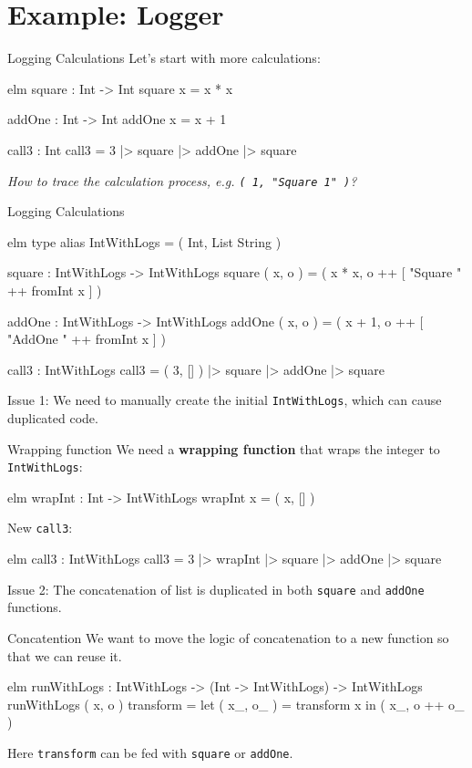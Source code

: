 \documentclass{beamer}
\begin{document}
\section{Example: Logger}

\begin{frame}[fragile]{Logging Calculations}
	Let's start with more calculations:
	\begin{codetbox}{elm}
square : Int -> Int
square x =
    x * x

addOne : Int -> Int
addOne x =
    x + 1

call3 : Int
call3 =
    3 |> square |> addOne |> square
	\end{codetbox}
	\pause
	\em How to trace the calculation process, e.g. {\tt ( 1, "Square 1" )}? \em
\end{frame}

\begin{frame}[fragile]{Logging Calculations}
	\begin{codetbox}{elm}
type alias IntWithLogs =
    ( Int, List String )

square : IntWithLogs -> IntWithLogs
square ( x, o ) =
    ( x * x, o ++ [ "Square " ++ fromInt x ] )

addOne : IntWithLogs -> IntWithLogs
addOne ( x, o ) =
    ( x + 1, o ++ [ "AddOne " ++ fromInt x ] )

call3 : IntWithLogs
call3 =
    ( 3, [] ) |> square |> addOne |> square
	\end{codetbox}
	\pause
	Issue 1: We need to manually create the initial {\tt IntWithLogs}, which can cause
	duplicated code.

\end{frame}

\begin{frame}[fragile]{Wrapping function}
	We need a \textbf{wrapping function} that wraps the integer to {\tt IntWithLogs}:
	\begin{codetbox}{elm}
wrapInt : Int -> IntWithLogs
wrapInt x =
  ( x, [] )
	\end{codetbox}
	New {\tt call3}:
	\begin{codetbox}{elm}
call3 : IntWithLogs
call3 =
  3 |> wrapInt |> square |> addOne |> square
	\end{codetbox}
	\pause
	Issue 2: The concatenation of list is duplicated in both {\tt square} and {\tt addOne} functions.
\end{frame}

\begin{frame}[fragile]{Concatention}
	We want to move the logic of concatenation to a new function so that we can reuse it.
	\begin{codetbox}{elm}
runWithLogs : IntWithLogs -> (Int -> IntWithLogs) -> IntWithLogs
runWithLogs ( x, o ) transform =
    let
        ( x_, o_ ) =
            transform x
    in
    ( x_, o ++ o_ )
	\end{codetbox}
	Here {\tt transform} can be fed with {\tt square} or {\tt addOne}.
\end{frame}
\end{document}
